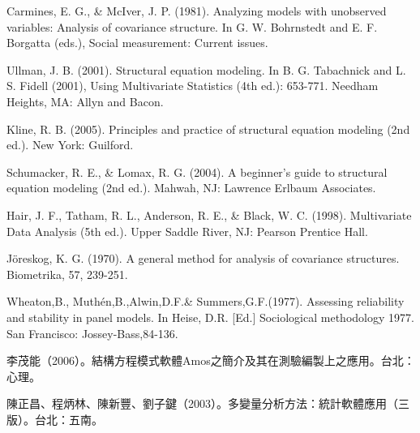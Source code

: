 \documentclass[letterpaper,12pt,titlepage,oneside,final,a4j,dvipdfmx]{book}
\begin{document}
\begin{thebibliography}{50}
 Carmines, E. G., \& McIver, J. P. (1981). Analyzing models with unobserved variables: Analysis of covariance structure. In G. W. Bohrnstedt and E. F. Borgatta (eds.), Social measurement: Current issues.

 Ullman, J. B. (2001). Structural equation modeling. In B. G. Tabachnick and L. S. Fidell (2001), Using Multivariate Statistics (4th ed.): 653-771. Needham Heights, MA: Allyn and Bacon.

 Kline, R. B. (2005). Principles and practice of structural equation modeling (2nd ed.). New York: Guilford.

 Schumacker, R. E., \& Lomax, R. G. (2004). A beginner's guide to structural equation modeling (2nd ed.). Mahwah, NJ: Lawrence Erlbaum Associates.

 Hair, J. F., Tatham, R. L., Anderson, R. E., \& Black, W. C. (1998). Multivariate Data Analysis (5th ed.). Upper Saddle River, NJ: Pearson Prentice Hall.

 Jöreskog, K. G. (1970). A general method for analysis of covariance structures. Biometrika, 57, 239-251.

 Wheaton,B., Muthén,B.,Alwin,D.F.\& Summers,G.F.(1977). Assessing reliability and stability in panel models. In Heise, D.R. [Ed.] Sociological methodology 1977. San Francisco: Jossey-Bass,84-136.

 李茂能（2006）。結構方程模式軟體Amos之簡介及其在測驗編製上之應用。台北：心理。

 陳正昌、程炳林、陳新豐、劉子鍵（2003）。多變量分析方法：統計軟體應用（三版）。台北：五南。

\end{thebibliography}

\end{document}

